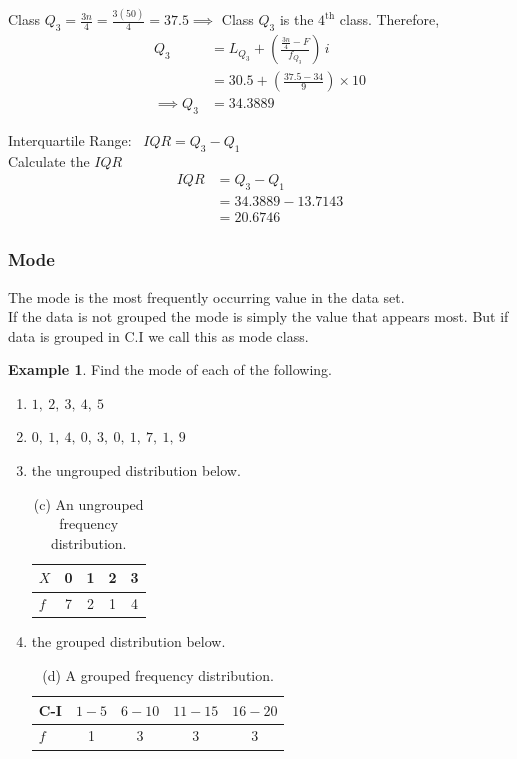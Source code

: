 \documentclass[11pt,a4paper]{article}
\theoremstyle{definition}
\newtheorem{example}[thm]{Example}
\begin{document}
Class $Q_3  = {\frac{3n}{4} = \frac{3(50)}{4} = 37.5} \implies$ Class $Q_3$ is the $4^{\text{th}}$ class. Therefore,
\begin{align*}
Q_3 & = L_{Q_3} + \left(\frac{\frac{3n}{4}-F}{f_{Q_3}}\right)\, i\\[1ex]
    & = 30.5 + \left(\frac{37.5-34}{9}\right)\times 10\\[1ex]
\implies Q_3 & = 34.3889
\end{align*}


Interquartile Range: \  $IQR = Q_3 - Q_1$\\

Calculate the $IQR$
\begin{align*}
IQR & = Q_3 - Q_1\\
    & = 34.3889 - 13.7143\\
    & = 20.6746
\end{align*}












\subsubsection{Mode}
The mode is the most frequently occurring value in the data set.\\ If the data is not grouped the mode is simply the value that appears most. But if data is grouped in C.I we call this as mode class.\\


\begin{example}
Find the mode of each of the following.
\begin{enumerate}
\item[(a).] $1,\ 2,\ 3,\ 4,\ 5$
\item[(b).] $0,\ 1,\ 4,\ 0,\ 3,\ 0,\ 1,\ 7,\ 1,\ 9$
\item[(c).] the ungrouped distribution below.
\begin{table}[H]
\centering
\begin{tabular}{|l|c|c|c|c|}
\hline
$X$ & 0 & 1 & 2 & 3\\
\hline
$f$ & 7 & 2 & 1 & 4\\
\hline
\end{tabular}
\caption{(c) An ungrouped frequency distribution.}
\end{table}
\item[(d).] the grouped distribution below.
\begin{table}[H]
\centering
\begin{tabular}{|l|c|c|c|c|}
\hline
C-I & $1-5$ & $6-10$ & $11-15$ & $16-20$\\
\hline
$f$ & 1 & 3 & 3 & 3\\
\hline
\end{tabular}
\caption{(d) A grouped frequency distribution.}
\end{table}
\end{enumerate}
\end{example}
\end{document}
